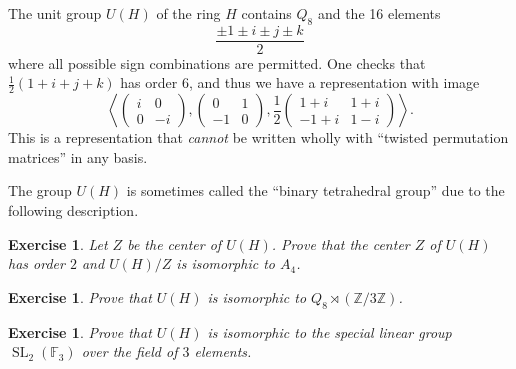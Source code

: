 \documentclass[12pt]{article}
\theoremstyle{plain}
\newtheorem{exercise}[theorem]{Exercise}
\theoremstyle{definition}
\theoremstyle{remark}
\numberwithin{equation}{section}
\begin{document}
The unit group $U(H)$ of the ring $H$ contains $Q_8$ and the 16 elements
\[
\frac{ \pm 1 \pm i \pm j \pm k }{2}
\]
where all possible sign combinations are permitted.
One checks that $\frac{1}{2}(1+i+j+k)$ has order $6$, and thus we have a
representation with image
\[
\left\langle \begin{pmatrix} i&0\\0&-i \end{pmatrix},
\begin{pmatrix} 0&1\\-1&0 \end{pmatrix},
\frac{1}{2} \begin{pmatrix} 1+i&1+i\\-1+i&1-i \end{pmatrix}\right\rangle
.
\]
This is a representation that \emph{cannot} be written wholly with
``twisted permutation matrices'' in any basis.

The group $U(H)$ is sometimes called the ``binary tetrahedral group''
due to the following description.

\begin{exercise}
Let $Z$ be the center of $U(H)$.
Prove that the center $Z$ of $U(H)$ has order $2$ and
$U(H)/Z $ is isomorphic to $A_4$.
\end{exercise}

\begin{exercise}
Prove that $U(H)$ is isomorphic to $Q_8 \rtimes (\mathbb{Z}/3\mathbb{Z})$.
\end{exercise}

\begin{exercise}
Prove that $U(H)$ is isomorphic to the special linear group
$\operatorname{SL}_2(\mathbb{F}_3)$ over the field of $3$ elements.
\end{exercise}




\end{document}
